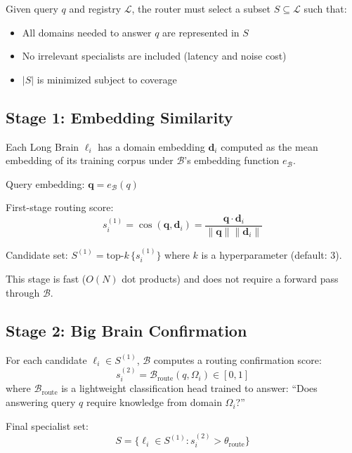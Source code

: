 \documentclass[12pt]{article}
\begin{document}
Given query $q$ and registry $\mathcal{L}$, the router must select a subset $S \subseteq \mathcal{L}$ such that:
\begin{itemize}
    \item All domains needed to answer $q$ are represented in $S$
    \item No irrelevant specialists are included (latency and noise cost)
    \item $|S|$ is minimized subject to coverage
\end{itemize}

\subsection{Stage 1: Embedding Similarity}

Each Long Brain $\ell_i$ has a domain embedding $\mathbf{d}_i$ computed as the mean embedding of its training corpus under $\mathcal{B}$'s embedding function $e_\mathcal{B}$.

Query embedding: $\mathbf{q} = e_\mathcal{B}(q)$

First-stage routing score:
\begin{equation}
s_i^{(1)} = \cos(\mathbf{q}, \mathbf{d}_i) = \frac{\mathbf{q} \cdot \mathbf{d}_i}{\|\mathbf{q}\| \|\mathbf{d}_i\|}
\end{equation}

Candidate set: $S^{(1)} = \text{top-}k\,\{s_i^{(1)}\}$ where $k$ is a hyperparameter (default: 3).

This stage is fast ($O(N)$ dot products) and does not require a forward pass through $\mathcal{B}$.

\subsection{Stage 2: Big Brain Confirmation}

For each candidate $\ell_i \in S^{(1)}$, $\mathcal{B}$ computes a routing confirmation score:
\begin{equation}
s_i^{(2)} = \mathcal{B}_{\text{route}}(q, \Omega_i) \in [0, 1]
\end{equation}
where $\mathcal{B}_{\text{route}}$ is a lightweight classification head trained to answer: ``Does answering query $q$ require knowledge from domain $\Omega_i$?''

Final specialist set:
\begin{equation}
S = \{\ell_i \in S^{(1)} : s_i^{(2)} > \theta_{\text{route}}\}
\end{equation}
\end{document}
